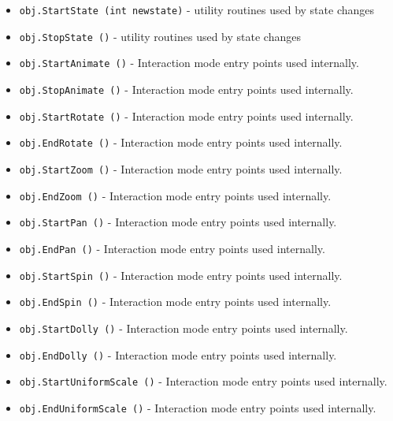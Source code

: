 \begin{itemize}
\item  \verb|obj.StartState (int newstate)| -  utility routines used by state changes

\item  \verb|obj.StopState ()| -  utility routines used by state changes

\item  \verb|obj.StartAnimate ()| -  Interaction mode entry points used internally.  

\item  \verb|obj.StopAnimate ()| -  Interaction mode entry points used internally.  

\item  \verb|obj.StartRotate ()| -  Interaction mode entry points used internally.  

\item  \verb|obj.EndRotate ()| -  Interaction mode entry points used internally.  

\item  \verb|obj.StartZoom ()| -  Interaction mode entry points used internally.  

\item  \verb|obj.EndZoom ()| -  Interaction mode entry points used internally.  

\item  \verb|obj.StartPan ()| -  Interaction mode entry points used internally.  

\item  \verb|obj.EndPan ()| -  Interaction mode entry points used internally.  

\item  \verb|obj.StartSpin ()| -  Interaction mode entry points used internally.  

\item  \verb|obj.EndSpin ()| -  Interaction mode entry points used internally.  

\item  \verb|obj.StartDolly ()| -  Interaction mode entry points used internally.  

\item  \verb|obj.EndDolly ()| -  Interaction mode entry points used internally.  

\item  \verb|obj.StartUniformScale ()| -  Interaction mode entry points used internally.  

\item  \verb|obj.EndUniformScale ()| -  Interaction mode entry points used internally.  


\end{itemize}
